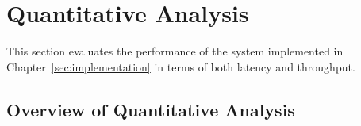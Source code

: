  





\section{Quantitative Analysis}
\label{sec:eva_Quantitative}
This section evaluates the performance of the system implemented in Chapter~\ref{sec:implementation} in terms of both latency and throughput.

\subsection{Overview of Quantitative Analysis}
\label{sec:eva_overwiwe_Quantitative}

